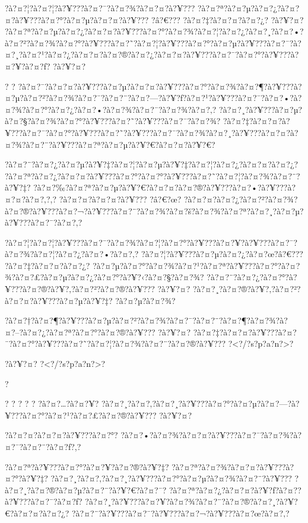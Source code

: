 \documentclass[11pt, openany]{book}
\begin{document}
{{{{{{{{{{{{{{{{?à?¤?¦?à?¤?¦?à?¥???à?¤?¯?à?¤?¾?à?¤?¤?à?¥???
?à?¤?ª?à?¤?µ?à?¤?¿?à?¤?¤?à?¥???à?¤?°?à?¤?µ?à?¤?¤?à?¥??? ?â?€???
?à?¤?‡?à?¤?¤?à?¤?¿? ?à?¥?¤?
?à?¤?ª?à?¤?µ?à?¤?¿?à?¤?¤?à?¥???à?¤?°?à?¤?¾?à?¤?¦?à?¤?¿?à?¤?¸?à?¤?•?à?¤?²?à?¤?¾?à?¤?°?à?¥???à?¤?˜?à?¤?¦?à?¥???à?¤?°?à?¤?µ?à?¥???à?¤?¯?à?¤?¸?à?¤?¹?à?¤?¿?à?¤?¤?à?¤?®?à?¤?¿?à?¤?¤?à?¥???à?¤?¯?à?¤?°?à?¥???à?¤?¥?à?¤?ƒ?
?à?¥?¤?

? ?
?à?¤?¯?à?¤?¤?à?¥???à?¤?µ?à?¤?¤?à?¥???à?¤?°?à?¤?¾?à?¤?¶?à?¥???à?¤?µ?à?¤?²?à?¤?¾?à?¤?¯?à?¤?¨?à?¤?---?à?¥?ƒ?à?¤?¹?à?¥???à?¤?¯?à?¤?•?à?¤?¾?à?¤?°?à?¤?¿?à?¤?•?à?¤?¾?à?¤?¯?à?¤?¾?à?¤?‚?
?à?¤?¸?à?¥???à?¤?µ?à?¤?§?à?¤?¾?à?¤?°?à?¥???à?¤?˜?à?¥???à?¤?¯?à?¤?¾?
?à?¤?‡?à?¤?¤?à?¥???à?¤?¯?à?¤?°?à?¥???à?¤?˜?à?¥???à?¤?¯?à?¤?¾?à?¤?¸?à?¥???à?¤?¤?à?¤?¾?à?¤?¨?à?¥???à?¤?ª?à?¤?µ?à?¥?€?à?¤?¤?à?¥?€?

?à?¤?¨?à?¤?¿?à?¤?µ?à?¥?‡?à?¤?¦?à?¤?µ?à?¥?‡?à?¤?¦?à?¤?¿?à?¤?¤?à?¤?¿?
?à?¤?ª?à?¤?¿?à?¤?¤?à?¥???à?¤?°?à?¤?°?à?¥???à?¤?˜?à?¤?¦?à?¤?¾?à?¤?¨?à?¥?‡?
?à?¤?‰?à?¤?ª?à?¤?µ?à?¥?€?à?¤?¤?à?¤?®?à?¥???à?¤?•?à?¥???à?¤?¤?à?¤?‚?,?
?à?¤?¤?à?¤?¤?à?¥??? ?â?€?œ?
?à?¤?¤?à?¤?¿?à?¤?²?à?¤?¾?à?¤?®?à?¥???à?¤?¬?à?¥???à?¤?¨?à?¤?¾?à?¤?š?à?¤?¾?à?¤?ª?à?¤?¸?à?¤?µ?à?¥???à?¤?¯?à?¤?‚?

?à?¤?¦?à?¤?¦?à?¥???à?¤?¯?à?¤?¾?à?¤?¦?à?¤?°?à?¥???à?¤?¥?à?¥???à?¤?¯?à?¤?¾?à?¤?¦?à?¤?¿?à?¤?•?à?¤?‚?
?à?¤?¦?à?¥???à?¤?µ?à?¤?¿?à?¤?œ?â?€??? ?à?¤?‡?à?¤?¤?à?¤?¿?
?à?¤?µ?à?¤?°?à?¤?¾?à?¤?¹?à?¤?ª?à?¥???à?¤?°?à?¤?¾?à?¤?£?à?¤?µ?à?¤?¿?à?¤?°?à?¥?‹?à?¤?§?à?¤?¾?
?à?¤?¨?à?¤?¿?à?¤?°?à?¥???à?¤?®?à?¥?‚?à?¤?²?à?¤?®?à?¥??? ?à?¥?¤?
?à?¤?¸?à?¤?®?à?¥?‚?à?¤?²?à?¤?¤?à?¥???à?¤?µ?à?¥?‡? ?à?¤?µ?à?¤?¾?

?à?¤?†?à?¤?¶?à?¥???à?¤?µ?à?¤?²?à?¤?¾?à?¤?¯?à?¤?¨?à?¤?¶?à?¤?¾?à?¤?--?à?¤?¿?à?¤?ª?à?¤?°?à?¤?®?à?¥???
?à?¥?¤?
?à?¤?‡?à?¤?¤?à?¥???à?¤?¯?à?¤?°?à?¥???à?¤?˜?à?¤?¦?à?¤?¾?à?¤?¨?à?¤?®?à?¥???
?\textless{}?/?s?p?a?n?\textgreater{}?

?à?¥?¤? ?\textless{}?/?s?p?a?n?\textgreater{}?

?

? ? ? ? ? ?à?¤?\ldots{}?à?¤?¥?
?à?¤?¸?à?¤?‚?à?¤?¸?à?¥???à?¤?°?à?¤?µ?à?¤?---?à?¥???à?¤?°?à?¤?¹?à?¤?£?à?¤?®?à?¥???
?à?¥?¤?

?à?¤?¤?à?¤?¤?à?¥???à?¤?°?
?à?¤?•?à?¤?¾?à?¤?¤?à?¥???à?¤?¯?à?¤?¾?à?¤?¯?à?¤?¨?à?¤?ƒ?,?

?à?¤?ª?à?¥???à?¤?°?à?¤?¥?à?¤?®?à?¥?‡?
?à?¤?ª?à?¤?¾?à?¤?¤?à?¥???à?¤?°?à?¥?‡?
?à?¤?¸?à?¤?‚?à?¤?¸?à?¥???à?¤?°?à?¤?µ?à?¤?¾?à?¤?¨?à?¥???
?à?¤?¸?à?¤?®?à?¤?µ?à?¤?¨?à?¥?€?à?¤?¯?
?à?¤?ª?à?¤?¿?à?¤?¤?à?¥?ƒ?à?¤?­?à?¥???à?¤?¯?à?¤?ƒ?
?à?¤?¸?à?¥???à?¤?¥?à?¤?¾?à?¤?¨?à?¤?®?à?¤?¸?à?¥?€?à?¤?¤?à?¤?¿?
?à?¤?¨?à?¥???à?¤?¯?à?¥???à?¤?¬?à?¥???à?¤?œ?à?¤?‚?

}}}}}}}}}}}}}}}}
\end{document}
